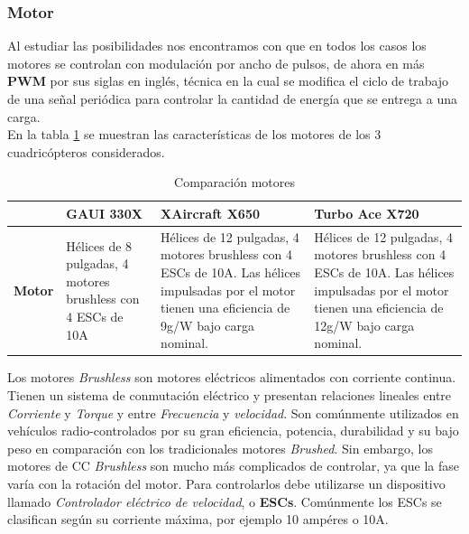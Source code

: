 \documentclass[main]{subfiles}
\begin{document}
\subsubsection*{Motor}
Al estudiar las posibilidades nos encontramos con que en todos los casos los motores se controlan con modulaci\'on por ancho de pulsos, de ahora en m\'as \textbf{PWM} por sus siglas en ingl\'es, t\'ecnica en la cual se modifica el ciclo de trabajo de una se\~nal peri\'odica para controlar la cantidad de energ\'ia que se entrega a una carga.\\

	En la tabla \ref{tab:motor} se muestran las caracter\'isticas de los motores de los 3 cuadric\'opteros considerados.\\

\begin{table}[H]
\begin{tabular}{p{40pt}|p{80pt}|p{130pt}|p{130pt}|} 
\cline{2-4}
& \cellcolor[gray]{0.8} \textbf{GAUI 330X} 
& \cellcolor[gray]{0.8} \textbf{XAircraft X650} 
& \cellcolor[gray]{0.8} \textbf{Turbo Ace X720} \\ \cline{2-4} \hline
\multicolumn{1}{|p{40pt}|}{\cellcolor[gray]{0.8}\textbf{Motor}} 
& H\'elices de 8 pulgadas, 4 motores brushless con 4 ESCs de 10A 
& H\'elices de 12 pulgadas, 4 motores brushless con 4 ESCs de 10A. Las h\'elices impulsadas por el motor tienen una eficiencia de 9g/W bajo carga nominal. 
& H\'elices de 12 pulgadas, 4 motores brushless con 4 ESCs de 10A. Las h\'elices impulsadas por el motor tienen una eficiencia de 12g/W bajo carga nominal.\\ \hline
\end{tabular} 
\caption{Comparaci\'on motores}
\label{tab:motor}
\end{table}

	Los motores \emph{Brushless} son motores el\'ectricos alimentados con corriente continua. Tienen un sistema de conmutaci\'on el\'ectrico y presentan relaciones lineales entre \emph{Corriente} y \emph{Torque} y entre \emph{Frecuencia} y \emph{velocidad}. Son com\'unmente utilizados en veh\'iculos radio-controlados por su gran eficiencia, potencia, durabilidad y su bajo peso en comparaci\'on con los tradicionales motores \emph{Brushed}. Sin embargo, los motores de CC \emph{Brushless} son mucho m\'as complicados de controlar, ya que la fase var\'ia con la rotaci\'on del motor. Para controlarlos debe utilizarse un dispositivo llamado \emph{Controlador el\'ectrico de velocidad}, o \textbf{ESCs}. Com\'unmente los ESCs se clasifican seg\'un su corriente m\'axima, por ejemplo 10 amp\'eres o 10A.\\
\end{document}
